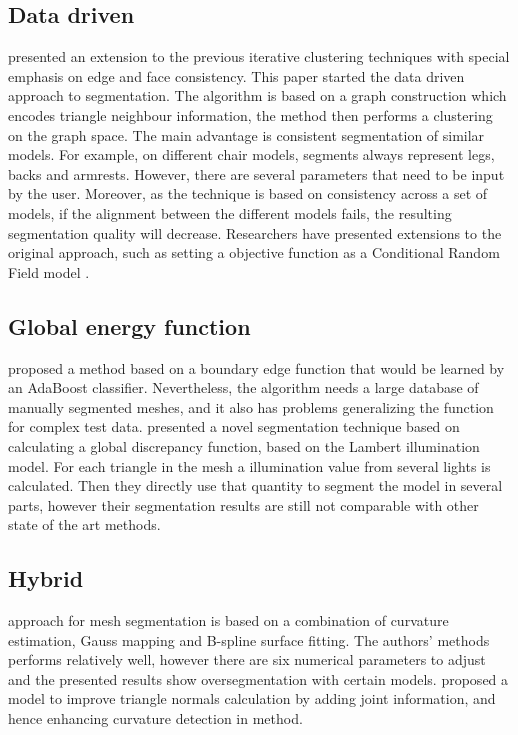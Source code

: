 \subsection{Data driven}

\cite{Golovinskiy2009} presented an extension to the previous iterative clustering techniques with special emphasis on edge and face consistency.
This paper started the data driven approach to segmentation.
The algorithm is based on a graph construction which encodes triangle neighbour information, the method then performs a clustering on the graph space.
The main advantage is consistent segmentation of similar models.
For example, on different chair models, segments always represent legs, backs and armrests. 
However, there are several parameters that need to be input by the user.
Moreover, as the technique is based on consistency across a set of models, if the alignment between the different models fails, the resulting segmentation quality will decrease.
Researchers have presented extensions to the original \cite{Golovinskiy2009} approach, such as setting a objective function as a Conditional Random Field model \cite{Kalogerakis2010}.

\subsection{Global energy function}

\cite{Benhabiles2011} proposed a method based on a boundary edge function that would be learned by an AdaBoost classifier.
Nevertheless, the algorithm needs a large database of manually segmented meshes, and it also has problems generalizing the function for complex test data.
\cite{DeCastro2014} presented a novel segmentation technique based on calculating a global discrepancy function, based on the Lambert illumination model.
For each triangle in the mesh a illumination value from several lights is calculated.
Then they directly use that quantity to segment the model in several parts, however their segmentation results are still not comparable with other state of the art methods.

\subsection{Hybrid}

\cite{Wang2011} approach for mesh segmentation is based on a combination of curvature estimation, Gauss mapping and B-spline surface fitting.
The authors' methods performs relatively well, however there are six numerical parameters to adjust and the presented results show oversegmentation with certain models.
\cite{Yang2014} proposed a model to improve triangle normals calculation by adding joint information, and hence enhancing curvature detection in \cite{Wang2011} method.

